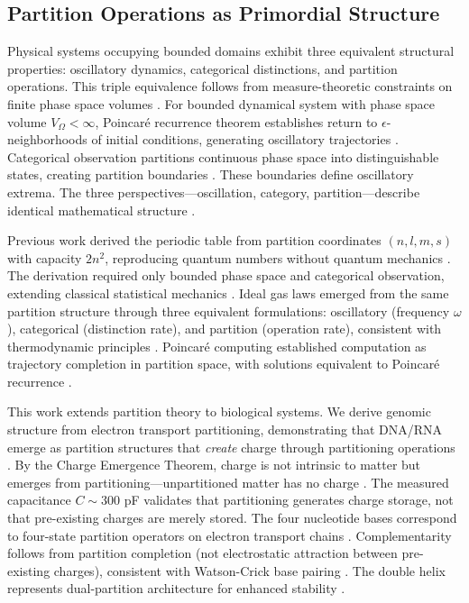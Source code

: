 \documentclass[11pt,a4paper]{article}
\theoremstyle{remark}
\begin{document}
\subsection{Partition Operations as Primordial Structure}

Physical systems occupying bounded domains exhibit three equivalent structural properties: oscillatory dynamics, categorical distinctions, and partition operations. This triple equivalence follows from measure-theoretic constraints on finite phase space volumes \citep{poincare1890probleme, birkhoff1931proof, arnold1978mathematical}. For bounded dynamical system with phase space volume $V_{\Omega} < \infty$, Poincaré recurrence theorem establishes return to $\epsilon$-neighborhoods of initial conditions, generating oscillatory trajectories \citep{poincare1890probleme}. Categorical observation partitions continuous phase space into distinguishable states, creating partition boundaries \citep{kolmogorov1957theory}. These boundaries define oscillatory extrema. The three perspectives—oscillation, category, partition—describe identical mathematical structure \citep{Sachikonye2025_IdealGas, Sachikonye2025_Poincare}.

Previous work derived the periodic table from partition coordinates $(n,l,m,s)$ with capacity $2n^2$, reproducing quantum numbers without quantum mechanics \citep{Sachikonye2025_Partition}. The derivation required only bounded phase space and categorical observation, extending classical statistical mechanics \citep{reif1965fundamentals, callen1985thermodynamics}. Ideal gas laws emerged from the same partition structure through three equivalent formulations: oscillatory (frequency $\omega$), categorical (distinction rate), and partition (operation rate), consistent with thermodynamic principles \citep{jarzynski1997nonequilibrium, crooks1999entropy, Sachikonye2025_IdealGas}. Poincaré computing established computation as trajectory completion in partition space, with solutions equivalent to Poincaré recurrence \citep{poincare1890probleme, Sachikonye2025_Poincare}.

This work extends partition theory to biological systems. We derive genomic structure from electron transport partitioning, demonstrating that DNA/RNA emerge as partition structures that \emph{create} charge through partitioning operations \citep{watson1953molecular, bloomfield1997dna, kornyshev2007physics}. By the Charge Emergence Theorem, charge is not intrinsic to matter but emerges from partitioning---unpartitioned matter has no charge \citep{Sachikonye2025_Partition}. The measured capacitance $C \sim 300$ pF validates that partitioning generates charge storage, not that pre-existing charges are merely stored. The four nucleotide bases correspond to four-state partition operators on electron transport chains \citep{nicholls2013bioenergetics, mitchell1961coupling}. Complementarity follows from partition completion (not electrostatic attraction between pre-existing charges), consistent with Watson-Crick base pairing \citep{watson1953molecular}. The double helix represents dual-partition architecture for enhanced stability \citep{travers2015dna}.
\end{document}
